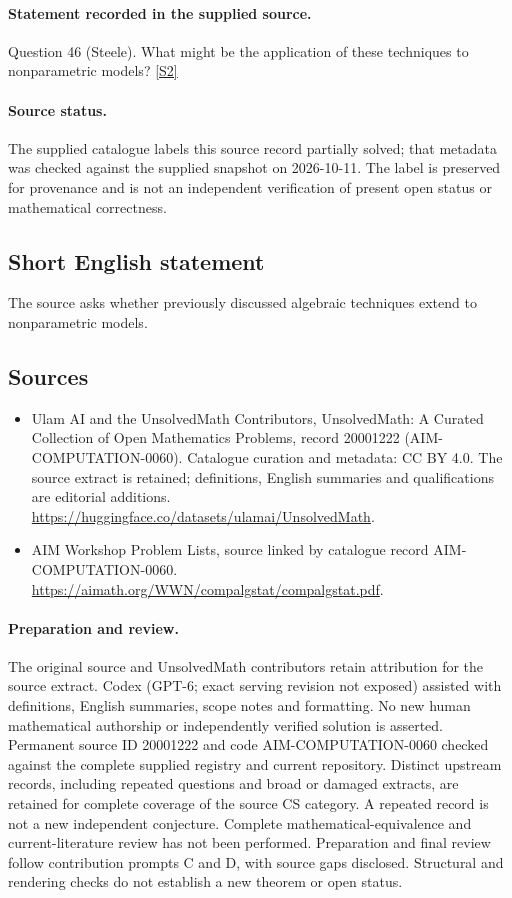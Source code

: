 \documentclass[11pt]{article}
\begin{document}
\paragraph{Statement recorded in the supplied source.}
Question 46 (Steele). What might be the application of these techniques to nonparametric models? \href{https://aimath.org/WWN/compalgstat/compalgstat.pdf}{[S2]}
\paragraph{Source status.}
The supplied catalogue labels this source record partially solved; that metadata was checked against the supplied snapshot on 2026-10-11. The label is preserved for provenance and is not an independent verification of present open status or mathematical correctness.
\subsection{Short English statement}
The source asks whether previously discussed algebraic techniques extend to nonparametric models.
\subsection{Sources}
\begin{itemize}
\item[S1] Ulam AI and the UnsolvedMath Contributors, UnsolvedMath: A Curated Collection of Open Mathematics Problems, record 20001222 (AIM-COMPUTATION-0060). Catalogue curation and metadata: CC BY 4.0. The source extract is retained; definitions, English summaries and qualifications are editorial additions.
\url{https://huggingface.co/datasets/ulamai/UnsolvedMath}.
\item[S2] AIM Workshop Problem Lists, source linked by catalogue record AIM-COMPUTATION-0060.
\url{https://aimath.org/WWN/compalgstat/compalgstat.pdf}.
\end{itemize}
\paragraph{Preparation and review.}
The original source and UnsolvedMath contributors retain attribution for the source extract. Codex (GPT-6; exact serving revision not exposed) assisted with definitions, English summaries, scope notes and formatting. No new human mathematical authorship or independently verified solution is asserted. Permanent source ID 20001222 and code AIM-COMPUTATION-0060 checked against the complete supplied registry and current repository. Distinct upstream records, including repeated questions and broad or damaged extracts, are retained for complete coverage of the source CS category. A repeated record is not a new independent conjecture. Complete mathematical-equivalence and current-literature review has not been performed. Preparation and final review follow contribution prompts C and D, with source gaps disclosed. Structural and rendering checks do not establish a new theorem or open status.
\label{end:20001222}
\end{document}

